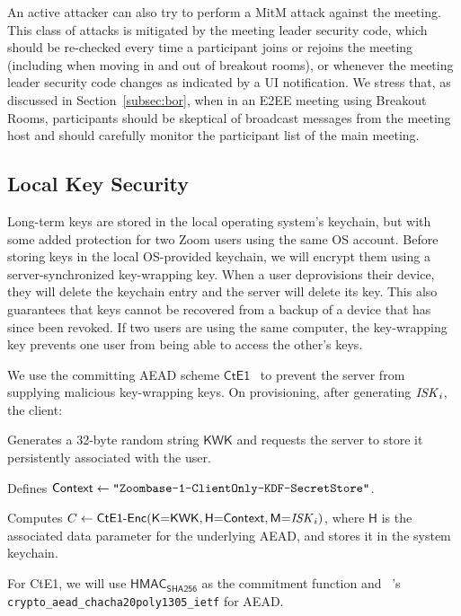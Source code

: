 An active attacker can also try to perform a MitM attack against the meeting. This class of attacks
is mitigated by the meeting leader security code, which should be re-checked every time a
participant joins or rejoins the meeting (including when moving in and out of breakout rooms), or
whenever the meeting leader security code changes as indicated by a UI notification. We stress that,
as discussed in Section~\ref{subsec:bor}, when in an E2EE meeting using Breakout Rooms, participants
should be skeptical of broadcast messages from the meeting host and should carefully monitor the
participant list of the main meeting.

\subsection{Local Key Security}
\label{subsec:lks}

Long-term keys are stored in the local operating system's keychain, but with some added protection
for two Zoom users using the same OS account.
%
Before storing keys in the local OS-provided keychain, we will encrypt them using a server-synchronized key-wrapping key.
%
When a user deprovisions their device, they will delete the keychain entry and the server will
delete its key. This also guarantees that keys cannot be recovered from a backup of a device that
has since been revoked.
%
If two users are using the same computer, the key-wrapping key prevents one user from being able to access the other's keys.

We use the committing AEAD scheme $\mathsf{CtE1}$~\cite{messagefranking} to prevent the server from supplying malicious key-wrapping keys.
%
On provisioning, after generating $\mathit{ISK}_i$, the client:
\begingroup
\RaggedRight
\begin{enumerate*}
\item Generates a 32-byte random string $\mathsf{KWK}$ and requests the server to store it persistently associated with the user.
\item Defines ${\sf Context} \leftarrow \texttt{"Zoombase-1-ClientOnly-KDF-SecretStore"}$.
\item Computes $C \leftarrow \textsf{CtE1-Enc}(\textsf{K}{=}\textsf{KWK}, \textsf{H}{=}{\sf Context}, \textsf{M}{=}\mathit{ISK}_i)$, where $\textsf{H}$ is the associated data parameter for the underlying AEAD, and stores it in the system keychain.
\end{enumerate*}
\endgroup

For \textsf{CtE1}, we will use $\textsf{HMAC}_{\textsf{SHA256}}$ as the
commitment function and \sodium{}~\cite{libsodium}'s \linebreak \texttt{crypto\_aead\_chacha20poly1305\_ietf} for AEAD.

